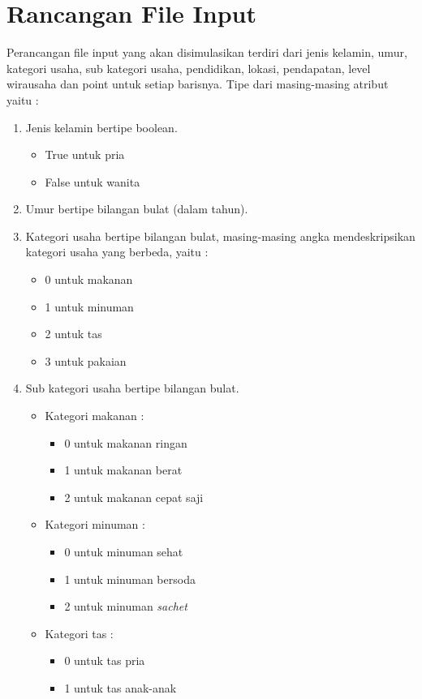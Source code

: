 \section{Rancangan File Input}
Perancangan file input yang akan disimulasikan terdiri dari jenis kelamin, umur, kategori usaha, sub kategori usaha, pendidikan, lokasi, pendapatan, level wirausaha dan point untuk setiap barisnya.
Tipe dari masing-masing atribut yaitu :
\begin{enumerate}
	\item Jenis kelamin bertipe boolean.
	\begin{itemize}
		\item True untuk pria
		\item False untuk wanita
	\end{itemize}
	\item Umur bertipe bilangan bulat (dalam tahun).
	\item Kategori usaha bertipe bilangan bulat, masing-masing angka mendeskripsikan kategori usaha yang berbeda, yaitu :
		\begin{itemize}
			\item 0 untuk makanan
			\item 1 untuk minuman
			\item 2 untuk tas
			\item 3 untuk pakaian
		\end{itemize}
	\item Sub kategori usaha bertipe bilangan bulat.
		\begin{itemize}
			\item Kategori makanan :
				\begin{itemize}
					\item 0 untuk makanan ringan
					\item 1 untuk makanan berat
					\item 2 untuk makanan cepat saji
				\end{itemize}
			\item Kategori minuman :
				\begin{itemize}
					\item 0 untuk minuman sehat
					\item 1 untuk minuman bersoda
					\item 2 untuk minuman \textit{sachet}
				\end{itemize}
			\item Kategori tas :
				\begin{itemize}
					\item 0 untuk tas pria
					\item 1 untuk tas anak-anak

\end{itemize}
\end{itemize}
\end{enumerate}
